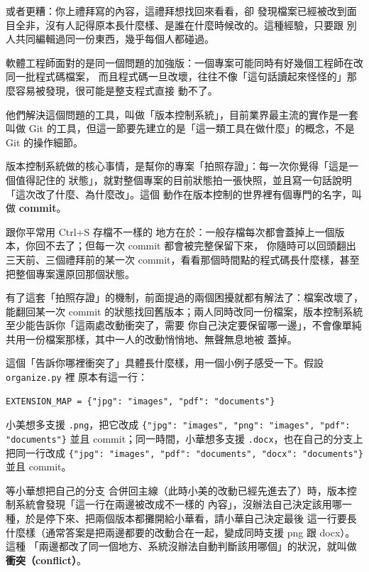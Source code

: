 或者更糟：你上禮拜寫的內容，這禮拜想找回來看看，卻
發現檔案已經被改到面目全非，沒有人記得原本長什麼樣、是誰在什麼時候改的。這種經驗，只要跟
別人共同編輯過同一份東西，幾乎每個人都碰過。

軟體工程師面對的是同一個問題的加強版：一個專案可能同時有好幾個工程師在改同一批程式碼檔案，
而且程式碼一旦改壞，往往不像「這句話讀起來怪怪的」那麼容易被發現，很可能是整支程式直接
動不了。

他們解決這個問題的工具，叫做「版本控制系統」，目前業界最主流的實作是一套叫做 Git
的工具，但這一節要先建立的是「這一類工具在做什麼」的概念，不是 Git 的操作細節。

版本控制系統做的核心事情，是幫你的專案「拍照存證」：每一次你覺得「這是一個值得記住的
狀態」，就對整個專案的目前狀態拍一張快照，並且寫一句話說明「這次改了什麼、為什麼改」。這個
動作在版本控制的世界裡有個專門的名字，叫做 \textbf{commit}。

跟你平常用 Ctrl+S 存檔不一樣的
地方在於：一般存檔每次都會蓋掉上一個版本，你回不去了；但每一次 commit 都會被完整保留下來，
你隨時可以回頭翻出三天前、三個禮拜前的某一次 commit，看看那個時間點的程式碼長什麼樣，甚至
把整個專案還原回那個狀態。


有了這套「拍照存證」的機制，前面提過的兩個困擾就都有解法了：檔案改壞了，能翻回某一次 commit
的狀態找回舊版本；兩人同時改同一份檔案，版本控制系統至少能告訴你「這兩處改動衝突了，需要
你自己決定要保留哪一邊」，不會像單純共用一份檔案那樣，其中一人的改動悄悄地、無聲無息地被
蓋掉。

這個「告訴你哪裡衝突了」具體長什麼樣，用一個小例子感受一下。假設 \texttt{organize.py} 裡
原本有這一行：

\begin{verbatim}
EXTENSION_MAP = {"jpg": "images", "pdf": "documents"}
\end{verbatim}

小美想多支援 \texttt{.png}，把它改成 \texttt{\{"jpg": "images", "png": "images", "pdf": "documents"\}}
並且 commit；同一時間，小華想多支援 \texttt{.docx}，也在自己的分支上把同一行改成
\texttt{\{"jpg": "images", "pdf": "documents", "docx": "documents"\}} 並且 commit。

等小華想把自己的分支
合併回主線（此時小美的改動已經先進去了）時，版本控制系統會發現「這一行在兩邊被改成不一樣的
內容」，沒辦法自己決定該用哪一種，於是停下來、把兩個版本都攤開給小華看，請小華自己決定最後
這一行要長什麼樣（通常答案是把兩邊都要的改動合在一起，變成同時支援 png 跟 docx）。這種
「兩邊都改了同一個地方、系統沒辦法自動判斷該用哪個」的狀況，就叫做\textbf{衝突（conflict）}。

